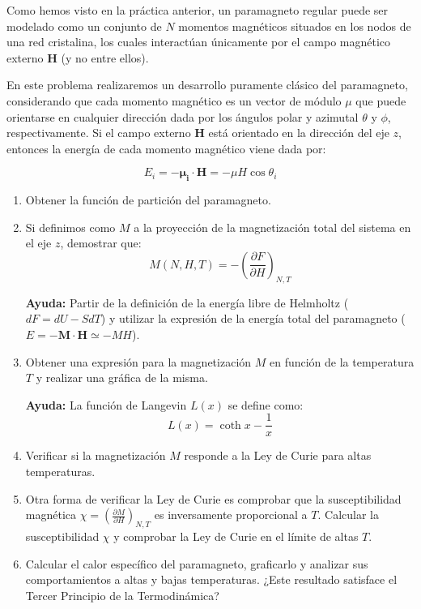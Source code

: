 \documentclass[a4paper,11pt]{article}
\begin{document}
Como hemos visto en la práctica anterior, un paramagneto regular puede ser 
modelado como un conjunto de $N$ momentos magnéticos situados en los 
nodos de una red cristalina, los cuales interactúan únicamente por el campo 
magnético externo $\textbf{H}$ (y no entre ellos).

En este problema realizaremos un desarrollo puramente clásico del 
paramagneto, considerando que cada momento magnético es un vector de 
módulo $\mu$ que puede orientarse en cualquier dirección dada por los 
ángulos polar y azimutal $\theta$ y $\phi$, respectivamente.
Si el campo externo $\textbf{H}$ está orientado en la dirección del eje 
$z$, entonces la energía de cada momento magnético viene dada por:

$$ E_i = - \boldsymbol{\mu_i} \cdot \textbf{H} = - \mu H \cos \theta_i $$


\begin{enumerate}[label=(\alph*),
                  leftmargin=2\parindent,
                  rightmargin=2\parindent]

    \item{Obtener la función de partición del paramagneto.}
    
    \item{Si definimos como $M$ a la proyección de la magnetización total del 
          sistema en el eje $z$, demostrar que:
          $$ M(N, H, T) = - \left( \frac{\partial F}{\partial H} 
          \right)_{N, T}$$
          }
    
    {\small
    \textbf{Ayuda:}
    Partir de la definición de la energía libre de Helmholtz ($ dF = dU 
    - S dT$) y utilizar la expresión de la energía total del 
    paramagneto ($ E = - \textbf{M} \cdot \textbf{H} \simeq - MH$).
    }
    
    \item{Obtener una expresión para la magnetización $M$ en función 
          de la temperatura $T$ y realizar una gráfica de la misma.}

    {\small
    \textbf{Ayuda:} La función de Langevin $L(x)$ se define como:
    $$ L(x) = \coth x - \frac{1}{x} $$
    }
    
    \item{Verificar si la magnetización $M$ responde a la Ley de Curie 
          para altas temperaturas.}
    
    \item{Otra forma de verificar la Ley de Curie es comprobar que la 
          susceptibilidad magnética
          $\chi = \left( \frac{\partial M}{\partial H}\right)_{N, T}$
          es inversamente proporcional a $T$.
          Calcular la susceptibilidad $\chi$ y comprobar la Ley de 
          Curie en el límite de altas $T$.
          }
    
    \item{Calcular el calor específico del paramagneto, graficarlo y 
          analizar sus comportamientos a altas y bajas temperaturas. 
          ¿Este resultado satisface el Tercer Principio de la 
          Termodinámica?}


\end{enumerate}
\end{document}
